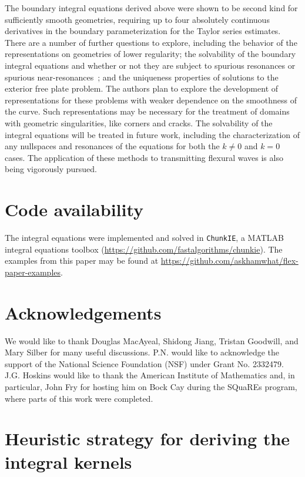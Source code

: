 \documentclass[preprint,12pt,3p]{elsarticle}
\begin{document}
The boundary integral equations derived above were shown to be second kind for sufficiently smooth
geometries, requiring up to four absolutely continuous derivatives in the boundary parameterization
for the Taylor series estimates. There are a number of 
further questions to explore, including the behavior of the representations on geometries of lower
regularity; the solvability of the boundary integral equations and whether or not they are subject
to spurious resonances or spurious near-resonances~\cite{zhao2015robust}; and the uniqueness properties 
of solutions to the exterior free plate problem. The authors plan to explore the development of
representations for these problems with weaker dependence on the smoothness of the curve. Such representations may be necessary for the treatment
of domains with geometric singularities, like corners and cracks. The solvability of the integral equations will
be treated in future work, including the characterization of any nullspaces and resonances of the equations
for both the $k\ne 0$ and $k=0$ cases. The application of these methods to transmitting flexural
waves is also being vigorously pursued. 


\section{Code availability}

The integral equations were implemented and solved in \texttt{ChunkIE}, a MATLAB integral equations toolbox (\url{https://github.com/fastalgorithms/chunkie}). The examples from this paper may be found at \url{https://github.com/askhamwhat/flex-paper-examples}. 

\section{Acknowledgements}

We would like to thank Douglas MacAyeal, Shidong Jiang, Tristan Goodwill, and Mary Silber for many useful discussions. P.N. would like to acknowledge the support of the National Science Foundation (NSF) under Grant No. 2332479. J.G. Hoskins would like to thank the American Institute of Mathematics and, in particular, John Fry for hosting him on Bock Cay during the SQuaREs program, where parts of this work were completed. 
\appendix

\section{Heuristic strategy for deriving the integral kernels}
\end{document}
